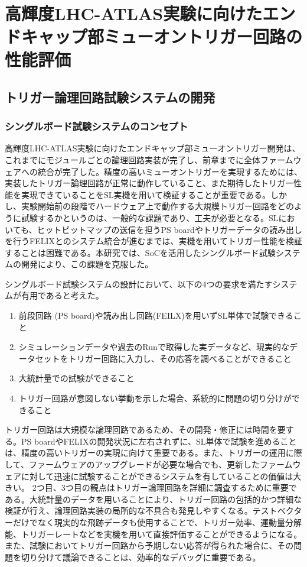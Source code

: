 　\chapter{高輝度LHC-ATLAS実験に向けたエンドキャップ部ミューオントリガー回路の性能評価}
\label{chap_TriggerTest}

\section{トリガー論理回路試験システムの開発}
\subsection{シングルボード試験システムのコンセプト}
高輝度LHC-ATLAS実験に向けたエンドキャップ部ミューオントリガー開発は、これまでにモジュールごとの論理回路実装が完了し、前章までに全体ファームウェアへの統合が完了した。精度の高いミューオントリガーを実現するためには、実装したトリガー論理回路が正常に動作していること、また期待したトリガー性能を実現できていることをSL実機を用いて検証することが重要である。しかし、実験開始前の段階でハードウェア上で動作する大規模トリガー回路をどのように試験するかというのは、一般的な課題であり、工夫が必要となる。SLにおいても、ヒットビットマップの送信を担うPS boardやトリガーデータの読み出しを行うFELIXとのシステム統合が進むまでは、実機を用いてトリガー性能を検証することは困難である。本研究では、SoCを活用したシングルボード試験システムの開発により、この課題を克服した。

シングルボード試験システムの設計において、以下の4つの要求を満たすシステムが有用であると考えた。

\begin{enumerate}
    \item 前段回路 (PS board)や読み出し回路(FEILX)を用いずSL単体で試験できること
    \item シミュレーションデータや過去のRunで取得した実データなど、現実的なデータセットをトリガー回路に入力し、その応答を調べることができること
    \item 大統計量での試験ができること
    \item トリガー回路が意図しない挙動を示した場合、系統的に問題の切り分けができること
\end{enumerate}

トリガー回路は大規模な論理回路であるため、その開発・修正には時間を要する。PS boardやFELIXの開発状況に左右されずに、SL単体で試験を進めることは、精度の高いトリガーの実現に向けて重要である。また、トリガーの運用に際して、ファームウェアのアップグレードが必要な場合でも、更新したファームウェアに対して迅速に試験することができるシステムを有していることの価値は大きい。
2つ目、3つ目の観点はトリガー論理回路を詳細に調査するために重要である。大統計量のデータを用いることにより、トリガー回路の包括的かつ詳細な検証が行え、論理回路実装の局所的な不具合も発見しやすくなる。テストベクターだけでなく現実的な飛跡データも使用することで、トリガー効率、運動量分解能、トリガーレートなどを実機を用いて直接評価することができるようになる。また、試験においてトリガー回路から予期しない応答が得られた場合に、その問題を切り分けて議論できることは、効率的なデバッグに重要である。

